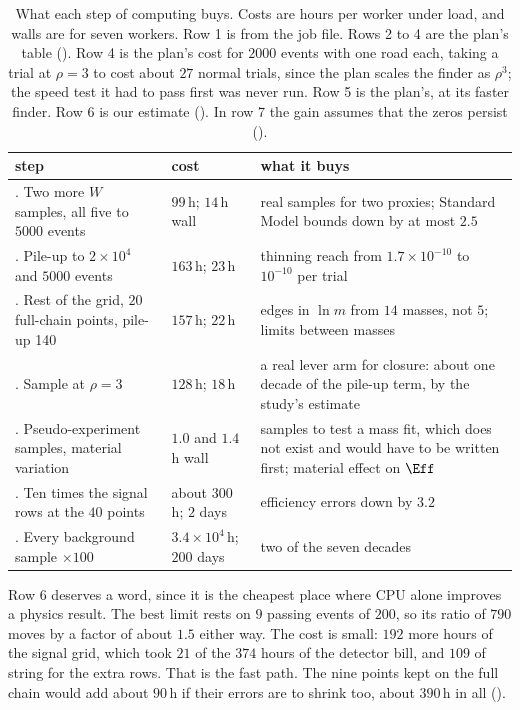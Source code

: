 \begin{table}
  \caption{What each step of computing buys. Costs are hours per worker under load, and walls are for seven workers. Row 1 is from the job file. Rows 2 to 4 are the plan's table (\EST). Row 4 is the plan's cost for $2000$ events with one road each, taking a trial at $\rho=3$ to cost about $27$ normal trials, since the plan scales the finder as $\rho^3$; the speed test it had to pass first was never run. Row 5 is the plan's, at its faster finder. Row 6 is our estimate (\EST). In row 7 the gain assumes that the zeros persist (\EST).}
  \label{tab:28-buy}
  \small\setlength{\tabcolsep}{4pt}
  \begin{tabular}{@{}>{\raggedright\arraybackslash}p{35mm}>{\raggedright\arraybackslash}p{18mm}>{\raggedright\arraybackslash}p{53mm}@{}}
    \toprule
    step & cost & what it buys\\
    \midrule
    1. Two more $W$ samples, all five to $5000$ events & $99$\,h; $14$\,h wall & real samples for two proxies; Standard Model bounds down by at most $2.5$\\
    \addlinespace
    2. Pile-up to $2\times10^4$ and $5000$ events & $163$\,h; $23$\,h & thinning reach from $1.7\times10^{-10}$ to $10^{-10}$ per trial\\
    \addlinespace
    3. Rest of the grid, $20$ full-chain points, pile-up 140 & $157$\,h; $22$\,h & edges in $\ln m$ from $14$ masses, not $5$; limits between masses\\
    \addlinespace
    4. Sample at $\rho=3$ & $128$\,h; $18$\,h & a real lever arm for closure: about one decade of the pile-up term, by the study's estimate\\
    \addlinespace
    5. Pseudo-experiment samples, material variation & $1.0$ and $1.4$\,h wall & samples to test a mass fit, which does not exist and would have to be written first; material effect on $\Eff$\\
    \addlinespace
    6. Ten times the signal rows at the $40$ points & about $300$\,h; $2$ days & efficiency errors down by $3.2$\\
    \addlinespace
    7. Every background sample $\times100$ & $3.4\times10^4$\,h; $200$ days & two of the seven decades\\
    \bottomrule
  \end{tabular}
\end{table}

Row 6 deserves a word, since it is the cheapest place where CPU alone improves a physics result. The best limit rests on $9$ passing events of $200$, so its ratio of $790$ moves by a factor of about $1.5$ either way. The cost is small: $192$ more hours of the signal grid, which took $21$ of the $374$ hours of the detector bill, and $109$ of string for the extra rows. That is the fast path. The nine points kept on the full chain would add about $90$\,h if their errors are to shrink too, about $390$\,h in all (\EST).

